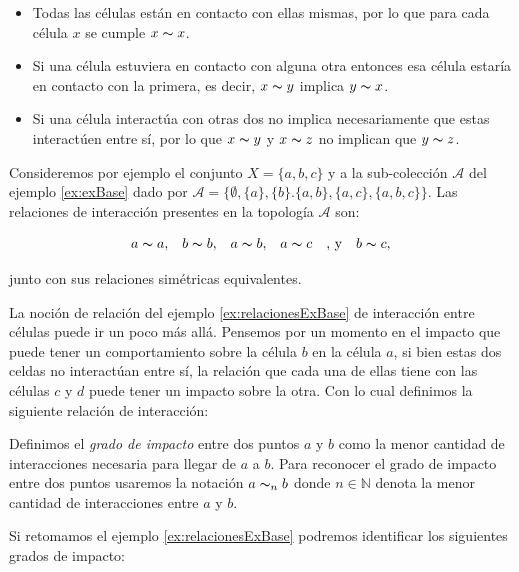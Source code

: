 \begin{itemize}
    \item Todas las células están en contacto con ellas mismas, por lo que para cada célula $x$ se cumple $x \thicksim x$.
    \item Si una célula estuviera en contacto con alguna otra entonces esa célula estaría en contacto con la primera, es decir, $x\thicksim y$ implica $y\thicksim x$.
    \item Si una célula interactúa con otras dos no implica necesariamente que estas interactúen entre sí, por lo que $x\thicksim y$ y $x\thicksim z$ no implican que $y\thicksim z$.
\end{itemize}

\begin{example}\label{ex:relacionesExBase}
Consideremos por ejemplo el conjunto $X=\{a,b,c\}$ y a la sub-colección $\mathcal{A}$ del ejemplo \ref{ex:exBase} dado por $\mathcal{A}=\{\emptyset,\{a\},\{b\}.\{a,b\},\{a,c\},\{a,b,c\}\}$. Las relaciones de interacción presentes en la topología $\mathcal{A}$ son:

$$\begin{array}{cccccc}
    a\thicksim a, & b\thicksim b, & a\thicksim b, & a\thicksim c & \text{, y} & b\thicksim c,
\end{array}$$

junto con sus relaciones simétricas equivalentes.
\end{example}

La noción de relación del ejemplo \ref{ex:relacionesExBase} de interacción entre células puede ir un poco más allá. Pensemos por un momento en el impacto que puede tener un comportamiento sobre la célula $b$ en la célula $a$, si bien estas dos celdas no interactúan entre sí, la relación que cada una de ellas tiene con las células $c$ y $d$ puede tener un impacto sobre la otra. Con lo cual definimos la siguiente relación de interacción:

\begin{definition}\label{def:gradoDeImpacto}
Definimos el \textit{grado de impacto} entre dos puntos $a$ y $b$ como la menor cantidad de interacciones necesaria para llegar de $a$ a $b$. Para reconocer el grado de impacto entre dos puntos usaremos la notación $a\thicksim_n b$ donde $n\in\mathbb{N}$ denota la menor cantidad de interacciones entre $a$ y $b$.
\end{definition}

Si retomamos el ejemplo \ref{ex:relacionesExBase} podremos identificar los siguientes grados de impacto:

